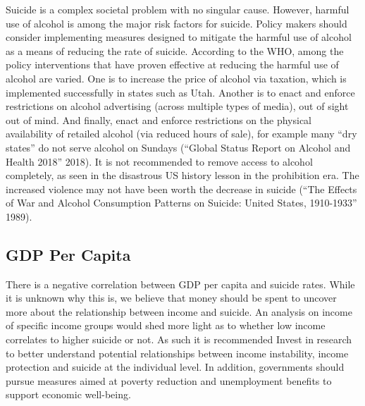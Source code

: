 \documentclass[]{article}
\begin{document}
Suicide is a complex societal problem with no singular cause. However,
harmful use of alcohol is among the major risk factors for suicide.
Policy makers should consider implementing measures designed to mitigate
the harmful use of alcohol as a means of reducing the rate of suicide.
According to the WHO, among the policy interventions that have proven
effective at reducing the harmful use of alcohol are varied. One is to
increase the price of alcohol via taxation, which is implemented
successfully in states such as Utah. Another is to enact and enforce
restrictions on alcohol advertising (across multiple types of media),
out of sight out of mind. And finally, enact and enforce restrictions on
the physical availability of retailed alcohol (via reduced hours of
sale), for example many ``dry states'' do not serve alcohol on Sundays
(``Global Status Report on Alcohol and Health 2018'' 2018). It is not
recommended to remove access to alcohol completely, as seen in the
disastrous US history lesson in the prohibition era. The increased
violence may not have been worth the decrease in suicide (``The Effects
of War and Alcohol Consumption Patterns on Suicide: United States,
1910-1933'' 1989).

\subsection{GDP Per Capita}\label{gdp-per-capita}

There is a negative correlation between GDP per capita and suicide
rates. While it is unknown why this is, we believe that money should be
spent to uncover more about the relationship between income and suicide.
An analysis on income of specific income groups would shed more light as
to whether low income correlates to higher suicide or not. As such it is
recommended Invest in research to better understand potential
relationships between income instability, income protection and suicide
at the individual level. In addition, governments should pursue measures
aimed at poverty reduction and unemployment benefits to support economic
well-being.
\end{document}
